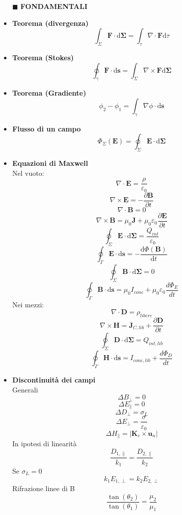 \documentclass{book}
\newcommand{\g}{\textbf}
\newcommand{\h}{\mathbf}
\newcommand{\e}{\begin{equation}}
\newcommand{\ex}{\end{equation} }
\renewcommand{\it}{\item[$\cdot$]}
\begin{document}
\begin{multicols}{4}
\begin{itemize}

\item [$\blacksquare$] \g{FONDAMENTALI}
    \it \g{Teorema (divergenza)}
        \e{\int_\Sigma \h{F} \cdot \mathrm{d} \h{\Sigma}= \int_\tau \nabla \cdot \h{F} \mathrm{d}\tau} \ex
    \it \g{Teorema (Stokes)}
        \e{\oint_\gamma\h{F}\cdot \mathrm{d}\h{s}=\int_\Sigma \nabla \times \h{F} \mathrm{d}\h{\Sigma}} \ex
    \it \g{Teorema (Gradiente)}
        \e{\phi_2-\phi_1=\int_\gamma\nabla\phi\cdot \mathrm{d}\h{s} }\ex
    \it \g{Flusso di un campo}
        \e{ \Phi_\Sigma(\h{E})=\oint_\Sigma \h{E}\cdot \mathrm{d}\h{\Sigma}   
        } \ex
    \it \g{Equazioni di Maxwell} \\
        Nel vuoto:
        \e{\nabla\cdot\h{E}=\frac{\rho}{\varepsilon_0}}\ex
        \e{\nabla\times\h{E}=-\frac{\partial \h{B}}{\partial t}} \ex
        \e{\nabla\cdot\h{B}}=0\ex
        \e{\nabla\times\h{B}=\mu_0\h{J}+\mu_0\varepsilon_0\frac{\partial \h{E}}{\partial t}} \ex
        \e{\oint_\Sigma\h{E}\cdot \mathrm{d}\h{\Sigma}=\frac{Q_{int}}{\varepsilon_0}} \ex
        \e{\oint_\Gamma\h{E}\cdot \mathrm{d}\h{s}=-\frac{\mathrm{d} \Phi(\h{B})}{\mathrm{d}t}} \ex
        \e{\oint_\Sigma\h{B}\cdot \mathrm{d}\h{\Sigma}=0} \ex
        \e{\oint_\Gamma\h{B}\cdot \mathrm{d}\h{s}=\mu_0 I_{conc} +\mu_0\varepsilon_0\frac{d \Phi_E}{d t}} \ex
        Nei mezzi:
        \e{\nabla\cdot\h{D}=\rho_{libere}}\ex
        \e{\nabla\times\h{H}=\h{J}_{C,lib}+\frac{\partial\h{D}}{\partial t}} \ex
        \e{\oint_\Sigma\h{D}\cdot \mathrm{d}\h{\Sigma}=Q_{int,lib}} \ex
        \e{\oint_\Gamma\h{H}\cdot \mathrm{d}\h{s}=I_{conc,lib} + \frac{d \Phi_D}{d t}} \ex
    \it \g{Discontinuità dei campi} \\
        Generali
        \e{\Delta B_\perp=0}\ex
        \e{\Delta E_\parallel=0}\ex
        \e{\Delta D_\perp=\sigma_L} \ex
        \e{\Delta E_\perp=\frac{\sigma}{\varepsilon_0}}\ex
        \e{\Delta H_\parallel=|\h{K}_c\times\h{u}_n|}\ex
        In ipotesi di linearità
        \e{\frac{D_{1,\parallel}}{k_1}=\frac{D_{2,\parallel}}{k_2}}\ex
        Se $\sigma_L=0$
        \e{k_1E_{1,\perp}=k_2E_{2,\perp}}\ex
        Rifrazione linee di B
        \e{\frac{\tan(\theta_2)}{\tan(\theta_1)}=\frac{\mu_2}{\mu_1}} \ex
        



\end{itemize}
\end{multicols}
\end{document}
